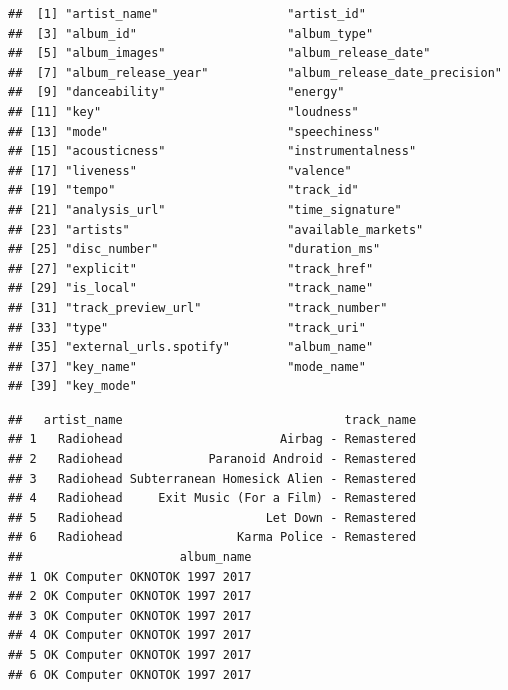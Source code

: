 \documentclass[
]{book}
\newenvironment{Shaded}{\begin{snugshade}}{\end{snugshade}}
\newcommand{\KeywordTok}[1]{\textcolor[rgb]{0.13,0.29,0.53}{\textbf{#1}}}
\newcommand{\NormalTok}[1]{#1}
\newcommand{\OperatorTok}[1]{\textcolor[rgb]{0.81,0.36,0.00}{\textbf{#1}}}
\newcommand{\StringTok}[1]{\textcolor[rgb]{0.31,0.60,0.02}{#1}}
\begin{document}
\begin{verbatim}
##  [1] "artist_name"                  "artist_id"                   
##  [3] "album_id"                     "album_type"                  
##  [5] "album_images"                 "album_release_date"          
##  [7] "album_release_year"           "album_release_date_precision"
##  [9] "danceability"                 "energy"                      
## [11] "key"                          "loudness"                    
## [13] "mode"                         "speechiness"                 
## [15] "acousticness"                 "instrumentalness"            
## [17] "liveness"                     "valence"                     
## [19] "tempo"                        "track_id"                    
## [21] "analysis_url"                 "time_signature"              
## [23] "artists"                      "available_markets"           
## [25] "disc_number"                  "duration_ms"                 
## [27] "explicit"                     "track_href"                  
## [29] "is_local"                     "track_name"                  
## [31] "track_preview_url"            "track_number"                
## [33] "type"                         "track_uri"                   
## [35] "external_urls.spotify"        "album_name"                  
## [37] "key_name"                     "mode_name"                   
## [39] "key_mode"
\end{verbatim}

\begin{Shaded}
\end{Shaded}

\begin{verbatim}
##   artist_name                               track_name
## 1   Radiohead                      Airbag - Remastered
## 2   Radiohead            Paranoid Android - Remastered
## 3   Radiohead Subterranean Homesick Alien - Remastered
## 4   Radiohead     Exit Music (For a Film) - Remastered
## 5   Radiohead                    Let Down - Remastered
## 6   Radiohead                Karma Police - Remastered
##                      album_name
## 1 OK Computer OKNOTOK 1997 2017
## 2 OK Computer OKNOTOK 1997 2017
## 3 OK Computer OKNOTOK 1997 2017
## 4 OK Computer OKNOTOK 1997 2017
## 5 OK Computer OKNOTOK 1997 2017
## 6 OK Computer OKNOTOK 1997 2017
\end{verbatim}
\end{document}

